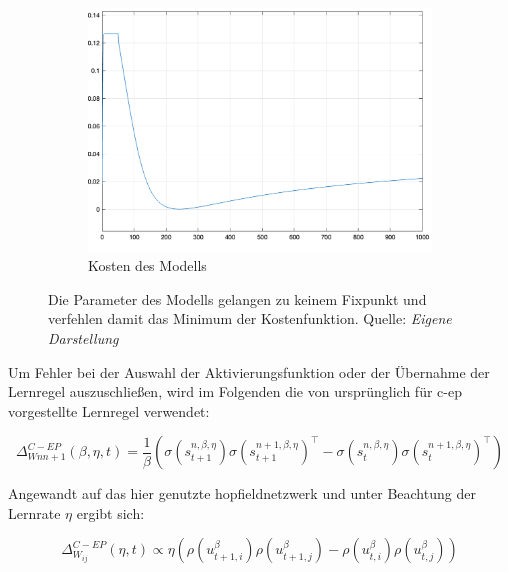 \begin{figure}[h]
\begin{subfigure}[b]{0.3\textwidth}
    \includegraphics[width=\textwidth]{abbildungen/c_ep_convergence_kosten.png}
    \caption{Kosten des Modells}
  \end{subfigure}
  \caption{Die Parameter des Modells gelangen zu keinem Fixpunkt und verfehlen damit das Minimum der Kostenfunktion. Quelle: \textit{Eigene Darstellung}}
  \label{fig:C-EP Konvergenz Problem}
\end{figure}

Um Fehler bei der Auswahl der Aktivierungsfunktion oder der Übernahme der Lernregel auszuschließen, wird im Folgenden die von \citeauthor{Ernoult2020} ursprünglich für \gls{c-ep} vorgestellte Lernregel verwendet:

\[\Delta^{C-EP}_{Wnn+1}(\beta,\eta,t)=\frac{1}{\beta}\left(\sigma\left(s^{n,\beta,\eta}_{t+1}\right)\sigma\left(s^{n+1,\beta,\eta}_{t+1}\right)^\intercal-\sigma\left(s^{n,\beta,\eta}_{t}\right)\sigma\left(s^{n+1,\beta,\eta}_{t}\right)^\intercal\right)\]

Angewandt auf das hier genutzte \gls{hopfieldnetzwerk} und unter Beachtung der Lernrate \(\eta\) ergibt sich:

\[\Delta^{C-EP}_{W_{ij}}(\eta,t)\propto\eta\left(\rho(u^{\beta}_{t+1,i})\rho(u^{\beta}_{t+1,j})-\rho(u^{\beta}_{t,i})\rho(u^{\beta}_{t,j})\right)\]

